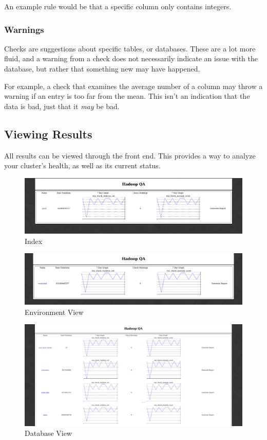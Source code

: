         An example rule would be that a specific column only contains integers.

        \subsubsection{Warnings}
        Checks are suggestions about specific tables, or databases. These are a lot more fluid, and a warning from a check does
        not necessarily indicate an issue with the database, but rather that something new may have happened.

        For example, a check that examines the average number of a column may throw a warning if an entry is too far from the
        mean. This isn't an indication that the data is bad, just that it \textit{may} be bad.

    \subsection{Viewing Results}
    All results can be viewed through the front end. This provides a way to analyze your cluster's health, as well as its
    current status.

    \begin{figure}[H]
        \centering
        \includegraphics[scale=0.2]{./img/index.png}
        \caption{Index}
    \end{figure}

    \begin{figure}[H]
        \centering
        \includegraphics[scale=0.2]{./img/prod.png}
        \caption{Environment View}
    \end{figure}

    \begin{figure}[H]
        \centering
        \includegraphics[scale=0.2]{./img/westwind.png}
        \caption{Database View}
    \end{figure}

